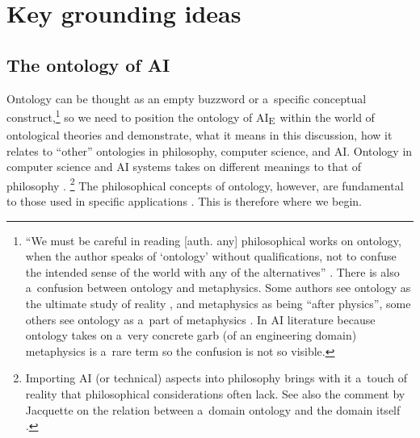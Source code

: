 {{\section{Key grounding ideas}
\subsection{The ontology of AI}

Ontology can be thought as an empty buzzword or a~specific conceptual construct,\footnote{``We must be careful in reading [auth. any] philosophical works on ontology, when the author speaks of ‘ontology' without qualifications, not to confuse the intended sense of the world with any of the alternatives''
\parencite[][p.3]{jacquette_ontology_2002}. %
 There is also a~confusion between ontology and metaphysics. Some authors see ontology as the ultimate study of reality 
\parencites[e.g.,][]{jacquette_ontology_2002}[][]{strozewski_ontologia_2004}[or][]{perzanowski_rozprawa_2015}, %
 and metaphysics as being ``after physics'', some others see ontology as a~part of metaphysics 
\parencite[see e.g.][]{van_inwagen_metaphysics_2009}. %
 In AI literature because ontology takes on a~very concrete garb (of an engineering domain) metaphysics is a~rare term so the confusion is not so visible.} so we need to position the ontology of AI\textsubscript{E~}within the world of ontological theories and demonstrate, what it means in this discussion, how it relates to ``other'' ontologies in philosophy, computer science, and AI. Ontology in computer science and AI systems 
\parencites[e.g.,][]{sharman_road_2007}[as well][]{guarino_ontologies_1995}[][]{guarino_what_2009}[][]{swar_unified_2022} %
 takes on different meanings to that of philosophy 
\parencites[e.g.,][]{jacquette_ontology_2002}[][]{strozewski_ontologia_2004}[][]{baker_metaphysics_2007}[][]{chalmers_metametaphysics_2009}[][]{effingham_introduction_2013}[][]{berto_ontology_2015}[][]{perzanowski_rozprawa_2015}[][]{thomasson_ontology_2015}[][]{hofweber_logic_2021}.%
\footnote{ Importing AI (or technical) aspects into philosophy brings with it a~touch of reality that philosophical considerations often lack. See also the comment by Jacquette on the relation between a~domain ontology and the domain itself 
\parencite[][p.5]{jacquette_ontology_2002}.%
} The philosophical concepts of ontology, however, are fundamental to those used in specific applications 
\parencite[see the comments of][p.XII]{jacquette_ontology_2002}. %
 This is therefore where we begin.

}}

